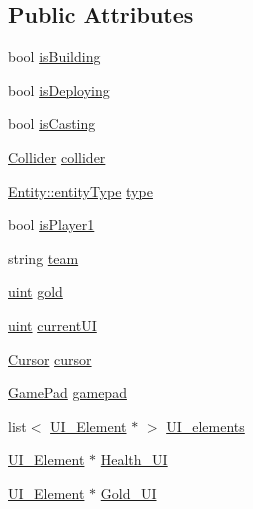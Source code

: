 \subsection*{Public Attributes}
\begin{DoxyCompactItemize}
\item 
bool \mbox{\hyperlink{class_player_a555d3b43aa9a20abb5cf6deae89d2f94}{is\+Building}}
\item 
bool \mbox{\hyperlink{class_player_aa9e69f9660d78baf171553e696ccbc2f}{is\+Deploying}}
\item 
bool \mbox{\hyperlink{class_player_a3f5b0dbf72823a61f934b78e7d697395}{is\+Casting}}
\item 
\mbox{\hyperlink{struct_collider}{Collider}} \mbox{\hyperlink{class_player_a10fd723bd44718d2b5c3ad12f7fd8ef5}{collider}}
\item 
\mbox{\hyperlink{class_entity_afd4a8ca3ac152f193c21d6a5100f1192}{Entity\+::entity\+Type}} \mbox{\hyperlink{class_player_a81e64dcef096cbaae8b3eeb8ae53c2e6}{type}}
\item 
bool \mbox{\hyperlink{class_player_ae5744673c12a6f91ffd251a1e3dfa510}{is\+Player1}}
\item 
string \mbox{\hyperlink{class_player_a046a64a6e7ec2e6ebce2178bccf9deab}{team}}
\item 
\mbox{\hyperlink{_defs_8h_a91ad9478d81a7aaf2593e8d9c3d06a14}{uint}} \mbox{\hyperlink{class_player_aee9df5718f5d385e2005408322c758fa}{gold}}
\item 
\mbox{\hyperlink{_defs_8h_a91ad9478d81a7aaf2593e8d9c3d06a14}{uint}} \mbox{\hyperlink{class_player_a384867971bd7a6919984f516feb34766}{current\+UI}}
\item 
\mbox{\hyperlink{struct_cursor}{Cursor}} \mbox{\hyperlink{class_player_a0bb16d20af73b941a5694e802a081cca}{cursor}}
\item 
\mbox{\hyperlink{struct_game_pad}{Game\+Pad}} \mbox{\hyperlink{class_player_a07c3f36cd10eb75c18b15aea6c5c4467}{gamepad}}
\item 
list$<$ \mbox{\hyperlink{class_u_i___element}{U\+I\+\_\+\+Element}} $\ast$ $>$ \mbox{\hyperlink{class_player_ae2211c0d011cb65b9dce646a3254bd27}{U\+I\+\_\+elements}}
\item 
\mbox{\hyperlink{class_u_i___element}{U\+I\+\_\+\+Element}} $\ast$ \mbox{\hyperlink{class_player_ac3f897bb94a9bd60e226423dbede3180}{Health\+\_\+\+UI}}
\item 
\mbox{\hyperlink{class_u_i___element}{U\+I\+\_\+\+Element}} $\ast$ \mbox{\hyperlink{class_player_a9076794bf5978f1c79dec7ace6a1e41e}{Gold\+\_\+\+UI}}

\end{DoxyCompactItemize}
